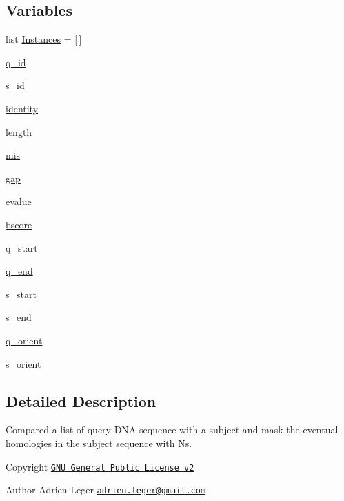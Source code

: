 \subsection*{Variables}
\begin{DoxyCompactItemize}
\item 
list \hyperlink{namespaceHomologyMasker_af353f622b88a872386648a331c09b7ec}{Instances} = \mbox{[}$\,$\mbox{]}
\item 
\hyperlink{namespaceHomologyMasker_a7ed6087cd5b71af36e04fc7b14404fbf}{q\-\_\-id}
\item 
\hyperlink{namespaceHomologyMasker_ac2f25129910dffef91ae818d733d4dca}{s\-\_\-id}
\item 
\hyperlink{namespaceHomologyMasker_a29c000fdc43af648c175041341b20b7d}{identity}
\item 
\hyperlink{namespaceHomologyMasker_ad039fae339d2981cc166e872097af80a}{length}
\item 
\hyperlink{namespaceHomologyMasker_a1aaaaf3e8d19615bab2d1123a2b815b4}{mis}
\item 
\hyperlink{namespaceHomologyMasker_afba3ae42634f80c7df2f46198386a57a}{gap}
\item 
\hyperlink{namespaceHomologyMasker_a7e1745cc4eda6e4fb742b5bf4da0efd3}{evalue}
\item 
\hyperlink{namespaceHomologyMasker_a615220b802ad22a46f3daea7491caac5}{bscore}
\item 
\hyperlink{namespaceHomologyMasker_a7801a7e7e88a2f65eb24d1bf21ff9e40}{q\-\_\-start}
\item 
\hyperlink{namespaceHomologyMasker_a7ad98af9d6be3028e1cfd7a538636db2}{q\-\_\-end}
\item 
\hyperlink{namespaceHomologyMasker_a65cb71d469b8f9488ed03494375c874d}{s\-\_\-start}
\item 
\hyperlink{namespaceHomologyMasker_a8ee2b993d4ff09d2b322b7511dfad6e9}{s\-\_\-end}
\item 
\hyperlink{namespaceHomologyMasker_ad6a4071a914fba5ea7d3dce772e64064}{q\-\_\-orient}
\item 
\hyperlink{namespaceHomologyMasker_a2d92bc9565ce2b8a00c0d1027f2ef5b7}{s\-\_\-orient}
\end{DoxyCompactItemize}


\subsection{Detailed Description}
Compared a list of query D\-N\-A sequence with a subject and mask the eventual homologies in the subject sequence with Ns. \begin{DoxyCopyright}{Copyright}
\href{http://www.gnu.org/licenses/gpl-2.0.html}{\tt G\-N\-U General Public License v2} 
\end{DoxyCopyright}
\begin{DoxyAuthor}{Author}
Adrien Leger \href{mailto:adrien.leger@gmail.com}{\tt adrien.\-leger@gmail.\-com} 
\end{DoxyAuthor}


